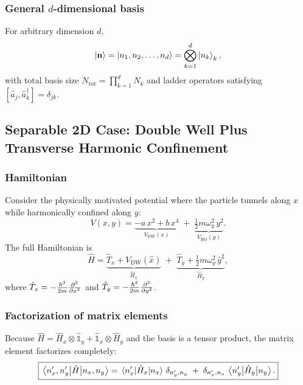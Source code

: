 \subsubsection{General $d$-dimensional basis}

For arbitrary dimension $d$,
\begin{equation}\label{eq:dd_basis}
    \ket{\mathbf{n}} = \ket{n_1, n_2, \dots, n_d}
    = \bigotimes_{k=1}^{d} \ket{n_k}_k,
\end{equation}
with total basis size $N_\mathrm{tot} = \prod_{k=1}^{d} N_k$ and ladder
operators satisfying $[\hat{a}_j, \hat{a}_k^\dagger] = \delta_{jk}$.

\subsection{Separable 2D Case: Double Well Plus Transverse Harmonic
Confinement}\label{sec:separable_2d}

\subsubsection{Hamiltonian}

Consider the physically motivated potential where the particle tunnels along
$x$ while harmonically confined along $y$:
\begin{equation}\label{eq:V_sep_2d}
    V(x,y) = \underbrace{-a\,x^2 + b\,x^4}_{V_\mathrm{DW}(x)}
    \;+\; \underbrace{\tfrac{1}{2}m\omega_y^2\, y^2}_{V_\mathrm{HO}(y)}.
\end{equation}
The full Hamiltonian is
\begin{equation}\label{eq:H_sep_2d}
    \hat{H} = \underbrace{\hat{T}_x + V_\mathrm{DW}(\hat{x})}_{\hat{H}_x}
    \;+\; \underbrace{\hat{T}_y + \tfrac{1}{2}m\omega_y^2\,\hat{y}^2}_{\hat{H}_y},
\end{equation}
where $\hat{T}_x = -\frac{\hbar^2}{2m}\pdv[2]{}{x}$ and
$\hat{T}_y = -\frac{\hbar^2}{2m}\pdv[2]{}{y}$.

\subsubsection{Factorization of matrix elements}

Because $\hat{H} = \hat{H}_x \otimes \hat{\mathbb{1}}_y
+ \hat{\mathbb{1}}_x \otimes \hat{H}_y$ and the basis is a tensor product,
the matrix element factorizes completely:
\begin{equation}\label{eq:sep_factorize}
    \boxed{
    \mel{n'_x, n'_y}{\hat{H}}{n_x, n_y}
    = \mel{n'_x}{\hat{H}_x}{n_x}\,\delta_{n'_y,n_y}
    \;+\; \delta_{n'_x,n_x}\,\mel{n'_y}{\hat{H}_y}{n_y}.
    }
\end{equation}

